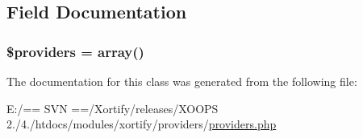 \subsection{Field Documentation}
\hypertarget{class_providers_a8619fb6079fbd79202034b45724fd6ca}{
\subsubsection[{\$providers}]{\setlength{\rightskip}{0pt plus 5cm}\$providers = array()}}\label{class_providers_a8619fb6079fbd79202034b45724fd6ca}


The documentation for this class was generated from the following file\-:\begin{DoxyCompactItemize}
\item 
E\-:/== S\-V\-N ==/\-Xortify/releases/\-X\-O\-O\-P\-S 2./4./htdocs/modules/xortify/providers/\hyperlink{providers_8php}{providers.\-php}\end{DoxyCompactItemize}
